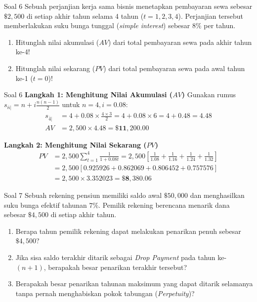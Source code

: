 \documentclass[11pt,a4paper]{article}
\begin{document}
\begin{problembox}{Soal 6}
Sebuah perjanjian kerja sama bisnis menetapkan pembayaran sewa sebesar $\$2{,}500$ di setiap akhir tahun selama 4 tahun ($t = 1, 2, 3, 4$). Perjanjian tersebut memberlakukan suku bunga tunggal (\textit{simple interest}) sebesar $8\%$ per tahun.
\begin{enumerate}[label=(\alph*)]
    \item Hitunglah nilai akumulasi ($AV$) dari total pembayaran sewa pada akhir tahun ke-4!
    \item Hitunglah nilai sekarang ($PV$) dari total pembayaran sewa pada awal tahun ke-1 ($t = 0$)!
\end{enumerate}
\end{problembox}

\begin{solutionbox}{Soal 6}
\textbf{Langkah 1: Menghitung Nilai Akumulasi ($AV$)}
Gunakan rumus $s_{\overline{n}|} = n + i \frac{n(n-1)}{2}$ untuk $n = 4, i = 0.08$:
\begin{align*}
    s_{\overline{4}|} &= 4 + 0.08 \times \frac{4 \times 3}{2} = 4 + 0.08 \times 6 = 4 + 0.48 = 4.48 \\[0.4em]
    AV &= 2{,}500 \times 4.48 = \mathbf{\$11{,}200.00}
\end{align*}

\textbf{Langkah 2: Menghitung Nilai Sekarang ($PV$)}
\begin{align*}
    PV &= 2{,}500 \sum_{t=1}^4 \frac{1}{1 + 0.08t} = 2{,}500 \left[ \frac{1}{1.08} + \frac{1}{1.16} + \frac{1}{1.24} + \frac{1}{1.32} \right] \\[0.4em]
       &= 2{,}500 \left[ 0.925926 + 0.862069 + 0.806452 + 0.757576 \right] \\[0.4em]
       &= 2{,}500 \times 3.352023 = \mathbf{\$8{,}380.06}
\end{align*}
\end{solutionbox}

\vspace{1.5em}

\begin{problembox}{Soal 7}
Sebuah rekening pensiun memiliki saldo awal $\$50{,}000$ dan menghasilkan suku bunga efektif tahunan $7\%$. Pemilik rekening berencana menarik dana sebesar $\$4{,}500$ di setiap akhir tahun.
\begin{enumerate}[label=(\alph*)]
    \item Berapa tahun pemilik rekening dapat melakukan penarikan penuh sebesar $\$4{,}500$?
    \item Jika sisa saldo terakhir ditarik sebagai \textit{Drop Payment} pada tahun ke-$(n+1)$, berapakah besar penarikan terakhir tersebut?
    \item Berapakah besar penarikan tahunan maksimum yang dapat ditarik selamanya tanpa pernah menghabiskan pokok tabungan (\textit{Perpetuity})?
\end{enumerate}
\end{problembox}
\end{document}
